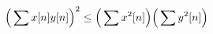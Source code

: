 \documentclass[preview]{standalone}
\begin{document}
\begin{align*}
\special{dvisvgm:raw <g id='unique000'>}\Big(\sum x[n]y[n]\Big)^2\leq\Big(\sum x^2[n]\Big)\Big(\sum y^2[n]\Big)\special{dvisvgm:raw </g>}
\end{align*}
\end{document}
